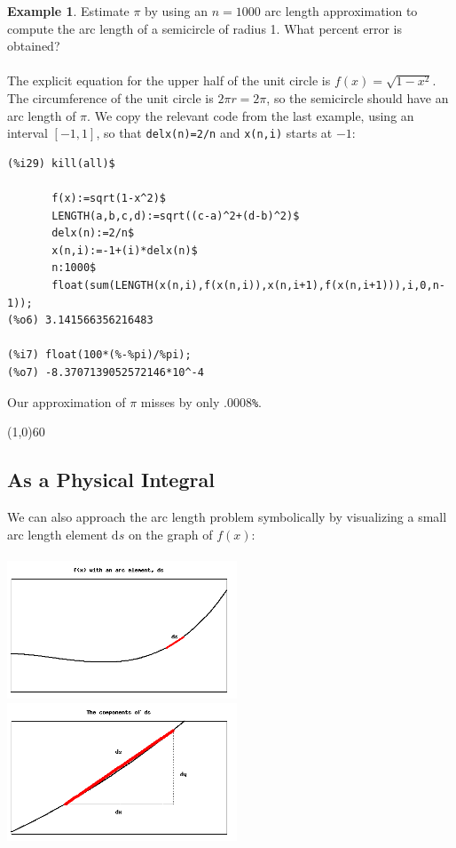 \documentclass[10.5pt,twoside]{report}
\theoremstyle{definition}
\newtheorem{exmp}{Example}[section]
\begin{document}
\begin{exmp} Estimate $\pi$ by using an $n=1000$ arc length approximation to compute the arc length of a semicircle of radius 1.  What percent error is obtained?\\
${}$\\
The explicit equation for the upper half of the unit circle is $f(x)=\sqrt{1-x^2}$.  The circumference of the unit circle is $2\pi r=2\pi$, so the semicircle should have an arc length of $\pi$.  We copy the relevant code from the last example, using an interval $[-1,1]$, so that \verb|delx(n)=2/n| and \verb|x(n,i)| starts at $-1$:

\begin{verbatim}
(%i29) kill(all)$

       f(x):=sqrt(1-x^2)$
       LENGTH(a,b,c,d):=sqrt((c-a)^2+(d-b)^2)$
       delx(n):=2/n$
       x(n,i):=-1+(i)*delx(n)$
       n:1000$
       float(sum(LENGTH(x(n,i),f(x(n,i)),x(n,i+1),f(x(n,i+1))),i,0,n-1));
(%o6) 3.141566356216483

(%i7) float(100*(%-%pi)/%pi);
(%o7) -8.3707139052572146*10^-4
\end{verbatim}

Our approximation of $\pi$ misses by only $.0008$\verb|%|.


\end{exmp}

\line(1,0){60}
\linethickness{0.5mm}

\pagebreak
\subsection{As a Physical Integral}

We can also approach the arc length problem symbolically by visualizing a small arc length element $\mathrm{d}s$ on the graph of $f(x)$:\\

${}$\\




\includegraphics[width=2.7in]{figure_3_3_2_1} %
\includegraphics[width=2.7in]{figure_3_3_2_2} %
\end{document}
